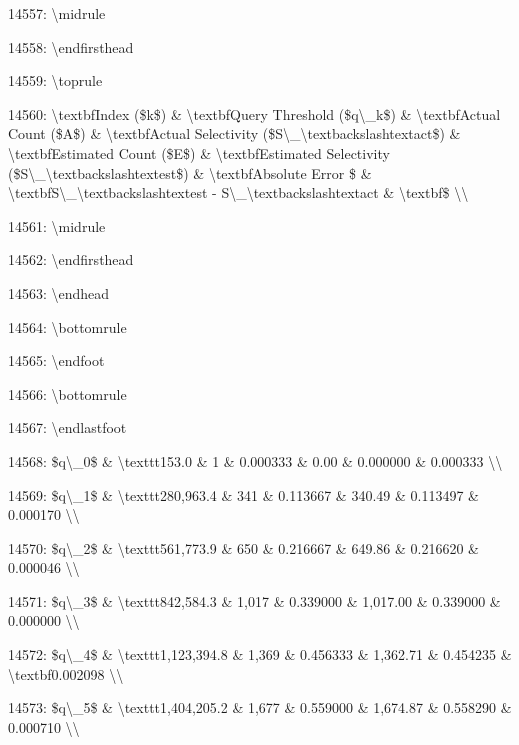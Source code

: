\documentclass[11pt,a4paper]{article}
\begin{document}
14557: \textbackslash{}midrule

14558: \textbackslash{}endfirsthead

14559: \textbackslash{}toprule

14560: \textbackslash{}textbf{Index (\$k\$)} \& \textbackslash{}textbf{Query Threshold (\$q\textbackslash{}\_k\$)} \& \textbackslash{}textbf{Actual Count (\$A\$)} \& \textbackslash{}textbf{Actual Selectivity (\$S\textbackslash{}\_{\textbackslash{}textbackslash{}text{act}}\$)} \& \textbackslash{}textbf{Estimated Count (\$E\$)} \& \textbackslash{}textbf{Estimated Selectivity (\$S\textbackslash{}\_{\textbackslash{}textbackslash{}text{est}}\$)} \& \textbackslash{}textbf{Absolute Error \$} \& \textbackslash{}textbf{S\textbackslash{}\_{\textbackslash{}textbackslash{}text{est}} - S\textbackslash{}\_{\textbackslash{}textbackslash{}text{act}}} \& \textbackslash{}textbf{\$} \textbackslash{}\textbackslash{}

14561: \textbackslash{}midrule

14562: \textbackslash{}endfirsthead

14563: \textbackslash{}endhead

14564: \textbackslash{}bottomrule

14565: \textbackslash{}endfoot

14566: \textbackslash{}bottomrule

14567: \textbackslash{}endlastfoot

14568: \$q\textbackslash{}\_0\$ \& \textbackslash{}texttt{153.0} \& 1 \& 0.000333 \& 0.00 \& 0.000000 \& 0.000333 \textbackslash{}\textbackslash{}

14569: \$q\textbackslash{}\_1\$ \& \textbackslash{}texttt{280,963.4} \& 341 \& 0.113667 \& 340.49 \& 0.113497 \& 0.000170 \textbackslash{}\textbackslash{}

14570: \$q\textbackslash{}\_2\$ \& \textbackslash{}texttt{561,773.9} \& 650 \& 0.216667 \& 649.86 \& 0.216620 \& 0.000046 \textbackslash{}\textbackslash{}

14571: \$q\textbackslash{}\_3\$ \& \textbackslash{}texttt{842,584.3} \& 1,017 \& 0.339000 \& 1,017.00 \& 0.339000 \& 0.000000 \textbackslash{}\textbackslash{}

14572: \$q\textbackslash{}\_4\$ \& \textbackslash{}texttt{1,123,394.8} \& 1,369 \& 0.456333 \& 1,362.71 \& 0.454235 \& \textbackslash{}textbf{0.002098} \textbackslash{}\textbackslash{}

14573: \$q\textbackslash{}\_5\$ \& \textbackslash{}texttt{1,404,205.2} \& 1,677 \& 0.559000 \& 1,674.87 \& 0.558290 \& 0.000710 \textbackslash{}\textbackslash{}
\end{document}

